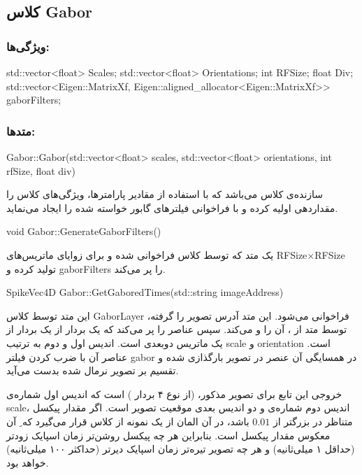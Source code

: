 \subsection{کلاس Gabor}
\subsubsection{ویژگی‌ها:}
\begin{C++source}
std::vector<float> Scales;
std::vector<float> Orientations;
int RFSize;
float Div;
std::vector<Eigen::MatrixXf, Eigen::aligned_allocator<Eigen::MatrixXf>> gaborFilters; 
\end{C++source}

\subsubsection{متدها:}
\begin{C++source}
Gabor::Gabor(std::vector<float> scales, std::vector<float> orientations, int rfSize, float div)
\end{C++source}
سازنده‌ی کلاس می‌باشد که با استفاده از مقادیر پارامترها، ویژگی‌های کلاس را مقداردهی اولیه کرده و با فراخوانی  فیلتر‌های گابور خواسته شده را ایجاد می‌نماید. 
\begin{C++source}
void Gabor::GenerateGaborFilters()
\end{C++source}
یک متد  که توسط  کلاس فراخوانی شده و برای زوایای  ماتریس‌های RFSize$\times$RFSize تولید کرده و gaborFilters را پر می‌کند.
\begin{C++source}
SpikeVec4D Gabor::GetGaboredTimes(std::string imageAddress)
\end{C++source}
این متد توسط کلاس GaborLayer فراخوانی می‌شود. این متد آدرس تصویر را گرفته، توسط متد  از ، آن را  و  می‌کند. سپس عناصر  را پر می‌کند که یک بردار از یک بردار از یک ماتریس دوبعدی است. اندیس اول و دوم به ترتیب scale و orientation است. عناصر آن با ضرب کردن فیلتر gabor در همسایگی آن عنصر در تصویر بارگذازی شده و تقسیم بر تصویر نرمال شده بدست می‌آید. 

خروجی این تابع برای تصویر مذکور،  (از نوع ۴ بردار ) است که اندیس اول شماره‌ی scale، اندیس دوم شماره‌ی  و دو اندیس بعدی موقعیت تصویر است. اگر مقدار پیکسل متناظر در  بزرگتر از $0.01$ باشد، در آن المان از  یک نمونه از کلاس  قرار می‌گیرد که  ِ آن  معکوس مقدار پیکسل است. بنابراین هر چه پیکسل روشن‌تر زمان اسپایک زودتر (حداقل ۱ میلی‌ثانیه) و هر چه تصویر تیره‌تر زمان اسپایک دیرتر (حداکثر ۱۰۰ میلی‌ثانیه) خواهد بود.

